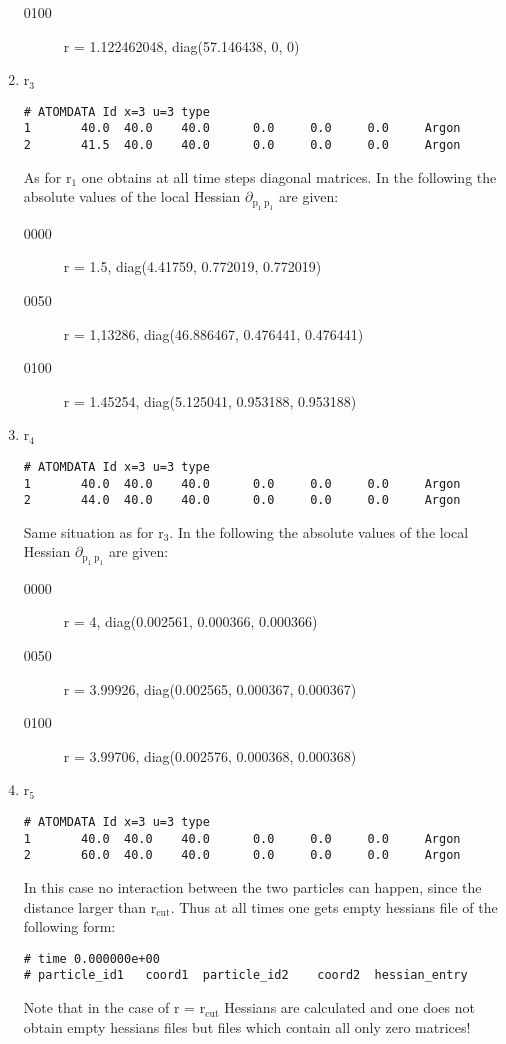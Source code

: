 \documentclass[11pt]{article}
\begin{document}
\begin{enumerate}
\begin{description}
\item[{0100}] r = 1.122462048, diag(57.146438, 0, 0)
\end{description}
\item r$_{\text{3}}$
\label{sec-1-4-1-4}
\begin{verbatim}
# ATOMDATA Id x=3 u=3 type
1       40.0  40.0    40.0      0.0     0.0     0.0     Argon
2       41.5  40.0    40.0      0.0     0.0     0.0     Argon
\end{verbatim}
As for r$_{\text{1}}$ one obtains at all time steps diagonal matrices.
In the following the absolute values of the local Hessian $\partial$$_{\text{p}_{\text{1}} \ \text{p}_{\text{1}}}$ are given:
\begin{description}
\item[{0000}] r = 1.5, diag(4.41759, 0.772019, 0.772019)
\item[{0050}] r = 1,13286, diag(46.886467, 0.476441, 0.476441)
\item[{0100}] r = 1.45254, diag(5.125041, 0.953188, 0.953188)
\end{description}
\item r$_{\text{4}}$
\label{sec-1-4-1-5}
\begin{verbatim}
# ATOMDATA Id x=3 u=3 type
1       40.0  40.0    40.0      0.0     0.0     0.0     Argon
2       44.0  40.0    40.0      0.0     0.0     0.0     Argon
\end{verbatim}
Same situation as for r$_{\text{3}}$.
In the following the absolute values of the local Hessian $\partial$$_{\text{p}_{\text{1}} \ \text{p}_{\text{1}}}$ are given:
\begin{description}
\item[{0000}] r = 4, diag(0.002561, 0.000366, 0.000366)
\item[{0050}] r = 3.99926, diag(0.002565, 0.000367, 0.000367)
\item[{0100}] r = 3.99706, diag(0.002576, 0.000368, 0.000368)
\end{description}
\item r$_{\text{5}}$
\label{sec-1-4-1-6}
\begin{verbatim}
# ATOMDATA Id x=3 u=3 type
1       40.0  40.0    40.0      0.0     0.0     0.0     Argon
2       60.0  40.0    40.0      0.0     0.0     0.0     Argon
\end{verbatim}
In this case no interaction between the two particles can happen, since the distance larger than r$_{\text{cut}}$. Thus at all times one gets empty hessians file of the following form:
\begin{verbatim}
# time 0.000000e+00
# particle_id1   coord1  particle_id2    coord2  hessian_entry
\end{verbatim}
Note that in the case of r = r$_{\text{cut}}$ Hessians are calculated and one does not obtain empty hessians files but files which contain all only zero matrices!
\end{enumerate}
\end{document}
